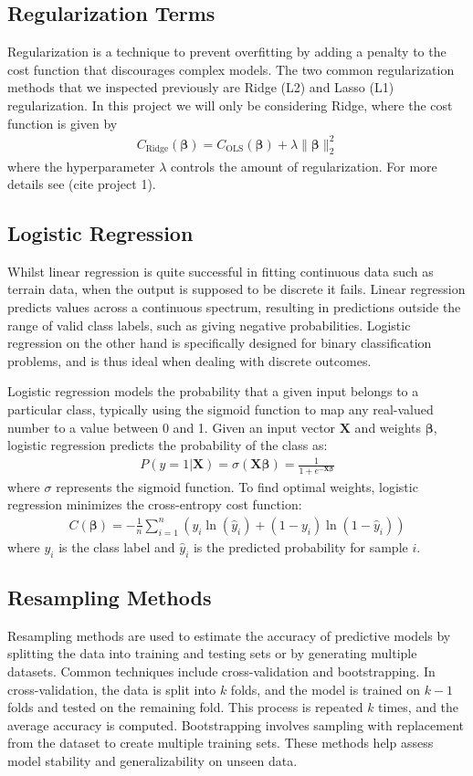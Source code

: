 \documentclass[%
reprint,
amsmath,amssymb,
aps,
]{revtex4-2}
\begin{document}
\subsection{Regularization Terms}
Regularization is a technique to prevent overfitting by adding a penalty to the cost function that discourages complex models. The two common regularization methods that we inspected previously are Ridge (L2) and Lasso (L1) regularization. In this project we will only be considering Ridge, where the cost function is given by
\begin{align}
	C_\text{Ridge}(\bm \beta) = C_\text{OLS}(\bm \beta) + \lambda \|\bm \beta\|_2^2
\end{align}
where the hyperparameter $\lambda$ controls the amount of regularization. For more details see (cite project 1).

\subsection{Logistic Regression}
Whilst linear regression is quite successful in fitting continuous data such as terrain data, when the output is supposed to be discrete it fails. Linear regression predicts values across a continuous spectrum, resulting in predictions outside the range of valid class labels, such as giving negative probabilities. Logistic regression on the other hand is specifically designed for binary classification problems, and is thus ideal when dealing with discrete outcomes. 

Logistic regression models the probability that a given input belongs to a particular class, typically using the sigmoid function to map any real-valued number to a value between 0 and 1. Given an input vector $\bm X$ and weights $\bm\beta$, logistic regression predicts the probability of the class as:
\begin{align}
	P(y=1|\bm X)=\sigma(\bm X\bm\beta)=\frac{1}{1+e^{-\bm X\bm\beta}}
\end{align}
where $\sigma$ represents the sigmoid function. To find optimal weights, logistic regression minimizes the cross-entropy cost function:
\begin{align}
	C(\bm\beta)=-\frac1n\sum_{i=1}^n\left(y_i \ln(\hat y_i)+(1-y_i)\ln(1-\hat y_i) \right)
\end{align}
where $y_i$ is the class label and $\hat{y}_i$ is the predicted probability for sample $i$.

\subsection{Resampling Methods}
Resampling methods are used to estimate the accuracy of predictive models by splitting the data into training and testing sets or by generating multiple datasets. Common techniques include cross-validation and bootstrapping. In cross-validation, the data is split into $k$ folds, and the model is trained on $k-1$ folds and tested on the remaining fold. This process is repeated $k$ times, and the average accuracy is computed. Bootstrapping involves sampling with replacement from the dataset to create multiple training sets. These methods help assess model stability and generalizability on unseen data.
\end{document}

